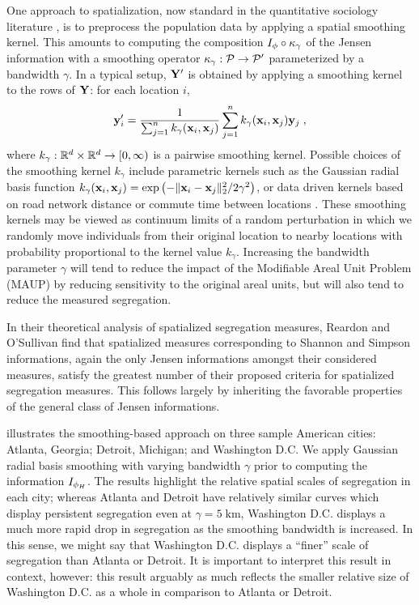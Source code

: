     One approach to spatialization, now standard in the quantitative sociology literature \cite{reardon3MeasuresSpatial2004}, is to preprocess the population data by applying a spatial smoothing kernel. 
    This amounts to computing the composition $I_\phi \circ \kappa_\gamma$ of the Jensen information with a smoothing operator $\kappa_\gamma: \mathcal{P} \rightarrow \mathcal{P}'$ parameterized by a bandwidth $\gamma$.
    In a typical setup, $\mathbf{Y}'$ is obtained by applying a smoothing kernel to the rows of $\mathbf{Y}$: for each location $i$, 
    \begin{align*}
      \mathbf{y}_i' = \frac{1}{\sum_{j = 1}^n k_\gamma(\mathbf{x}_i, \mathbf{x}_j)} \sum_{j = 1}^n k_\gamma(\mathbf{x}_i, \mathbf{x}_j) \mathbf{y}_j \;,
    \end{align*}
    where $k_\gamma: \mathbb{R}^d \times \mathbb{R}^d \rightarrow [0, \infty)$ is a pairwise smoothing kernel. 
    Possible choices of the smoothing kernel $k_\gamma$ include parametric kernels such as the Gaussian radial basis function $k_\gamma(\mathbf{x}_i, \mathbf{x}_j) = \exp \left( -\lVert \mathbf{x}_i - \mathbf{x}_j \rVert_2^2 / 2\gamma^2 \right)$, or data driven kernels based on road network distance or commute time between locations \cite{robertoSpatialProximityConnectivity2018}. 
    These smoothing kernels may be viewed as continuum limits of a random perturbation in which we randomly move individuals from their original location to nearby locations with probability proportional to the kernel value $k_\gamma$.
    Increasing the bandwidth parameter $\gamma$ will tend to reduce the impact of the Modifiable Areal Unit Problem (MAUP) by reducing sensitivity to the original areal units, but will also tend to reduce the measured segregation.

    In their theoretical analysis of spatialized segregation measures, Reardon and O'Sullivan \cite{reardon3MeasuresSpatial2004} find that spatialized measures corresponding to Shannon and Simpson informations, again the only Jensen informations amongst their considered measures, satisfy the greatest number of their proposed criteria for spatialized segregation measures.  
    This follows largely by inheriting the favorable properties of the general class of Jensen informations. 

     illustrates the smoothing-based approach on three sample American cities: Atlanta, Georgia; Detroit, Michigan; and Washington D.C. 
    We apply Gaussian radial basis smoothing with varying bandwidth $\gamma$ prior to computing the information $I_{\phi_H}$.  
    The results highlight the relative spatial scales of segregation in each city; whereas Atlanta and Detroit have relatively similar curves which display persistent segregation even at $\gamma = 5\;\mathrm{km}$, Washington D.C. displays a much more rapid drop in segregation as the smoothing bandwidth is increased.
    In this sense, we might say that Washington D.C. displays a ``finer'' scale of segregation than Atlanta or Detroit.
    It is important to interpret this result in context, however: this result arguably as much reflects the smaller relative size of Washington D.C. as a whole in comparison to Atlanta or Detroit. 
    


